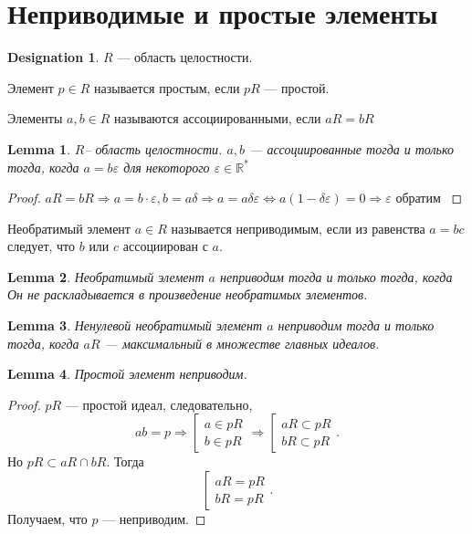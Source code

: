 \documentclass[11pt]{book}
\newcommand{\R}{\mathbb{R}}
\theoremstyle{definition}
\theoremstyle{plain}
\theoremstyle{plain}
\newtheorem{lm}{Lemma}
\theoremstyle{definition}
\newtheorem*{name}{Designation}
\theoremstyle{remark}
\begin{document}
\section{Неприводимые и простые элементы}
\begin{name}
    $ R$ --- область целостности.
\end{name}
 \begin{defn}
     Элемент $ p \in R$ называется {\sf простым}, если $ pR$ --- простой.
\end{defn}
\begin{defn}
    Элементы $ a, b \in  R$ называются  {\sf ассоциированными}, если $ aR = bR$
\end{defn}
\begin{lm}
    $ R $-- область целостности. $ a, b$ --- ассоциированные тогда и только тогда, когда  $ a = b \varepsilon $ для некоторого $ \varepsilon \in \R^{*}$
\end{lm}
\begin{proof}
    $ aR = bR \Rightarrow a = b \cdot \varepsilon , b = a \delta  \Rightarrow a = a \delta  \varepsilon  \Leftrightarrow a (1- \delta  \varepsilon ) = 0 \Rightarrow \varepsilon  \text{ обратим }$
\end{proof}
\begin{defn}
    Необратимый элемент $ a \in R$ называется {\sf неприводимым}, если из равенства $ a = bc$ следует, что  $ b$ или  $ c$ ассоциирован с  $ a$.
\end{defn}
\begin{lm}
    Необратимый элемент $ a$ неприводим  тогда и только тогда, когда Он не раскладывается в произведение необратимых элементов.
\end{lm}
\begin{lm}\label{lm_acc}
    Ненулевой необратимый элемент $ a$ неприводим  тогда и только тогда, когда $ aR$ --- максимальный в множестве главных идеалов.
\end{lm}
\begin{lm}\label{lm_p_np}
    Простой элемент неприводим.
\end{lm}
\begin{proof}
    $ pR$ --- простой идеал, следовательно,
    \[
    ab = p \Rightarrow 
    \left [
    \begin{array}{l}
	a \in  pR \\
	b \in  pR
        
    \end{array}
    \right .
    \Rightarrow 
    \left[
    \begin{array}{l}
        aR \subset pR \\
	bR \subset  pR
    \end{array}
    \right .
    .\] 
    Но $ pR \subset  aR \cap bR$. Тогда 
    \[
	\left[
	\begin{array}{l}
        aR = pR \\
	bR = pR
    \end{array}
    \right.
    .\] 
    Получаем, что $ p$ --- неприводим.
\end{proof}
\end{document}
